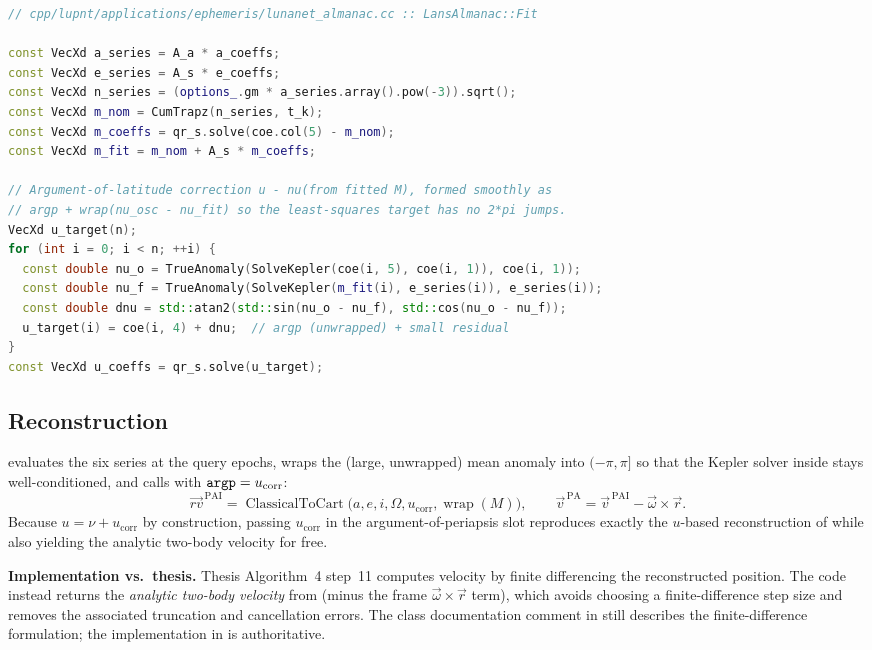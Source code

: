 \begin{lstlisting}[language=cpp, caption={Mean-anomaly residual and argument-of-latitude targets, \code{cpp/lupnt/applications/ephemeris/lunanet\_almanac.cc}.}, label={lst:eph-alm-fit}]
// cpp/lupnt/applications/ephemeris/lunanet_almanac.cc :: LansAlmanac::Fit

const VecXd a_series = A_a * a_coeffs;
const VecXd e_series = A_s * e_coeffs;
const VecXd n_series = (options_.gm * a_series.array().pow(-3)).sqrt();
const VecXd m_nom = CumTrapz(n_series, t_k);
const VecXd m_coeffs = qr_s.solve(coe.col(5) - m_nom);
const VecXd m_fit = m_nom + A_s * m_coeffs;

// Argument-of-latitude correction u - nu(from fitted M), formed smoothly as
// argp + wrap(nu_osc - nu_fit) so the least-squares target has no 2*pi jumps.
VecXd u_target(n);
for (int i = 0; i < n; ++i) {
  const double nu_o = TrueAnomaly(SolveKepler(coe(i, 5), coe(i, 1)), coe(i, 1));
  const double nu_f = TrueAnomaly(SolveKepler(m_fit(i), e_series(i)), e_series(i));
  const double dnu = std::atan2(std::sin(nu_o - nu_f), std::cos(nu_o - nu_f));
  u_target(i) = coe(i, 4) + dnu;  // argp (unwrapped) + small residual
}
const VecXd u_coeffs = qr_s.solve(u_target);
\end{lstlisting}

\subsection{Reconstruction}

 evaluates the six series at the query epochs, wraps the (large,
unwrapped) mean anomaly into $(-\pi, \pi]$ so that the Kepler solver inside
 stays well-conditioned, and calls 
with $\texttt{argp} = u_\mathrm{corr}$:
\begin{equation}
  \label{eq:eph-alm-reconstruct}
  \vec{rv}^{\,\mathrm{PAI}} = \operatorname{ClassicalToCart}
    \big(a, e, i, \Omega, u_\mathrm{corr}, \operatorname{wrap}(M)\big),
  \qquad
  \vec{v}^{\,\mathrm{PA}} = \vec{v}^{\,\mathrm{PAI}} - \vec{\omega}\times\vec{r}.
\end{equation}
Because $u = \nu + u_\mathrm{corr}$ by construction, passing $u_\mathrm{corr}$
in the argument-of-periapsis slot reproduces exactly the $u$-based
reconstruction of \citep[Algorithm~4, steps~6--10]{iiyama2026thesis} while
also yielding the analytic two-body velocity for free.

\begin{lupntnote}
  \textbf{Implementation vs.\ thesis.} Thesis Algorithm~4 step~11 computes
  velocity by finite differencing the reconstructed position. The code instead
  returns the \emph{analytic two-body velocity} from 
  (minus the frame $\vec{\omega}\times\vec{r}$ term), which avoids choosing a
  finite-difference step size and removes the associated truncation and
  cancellation errors. The class documentation comment in
   still describes the
  finite-difference formulation; the implementation in
   is authoritative.
\end{lupntnote}

